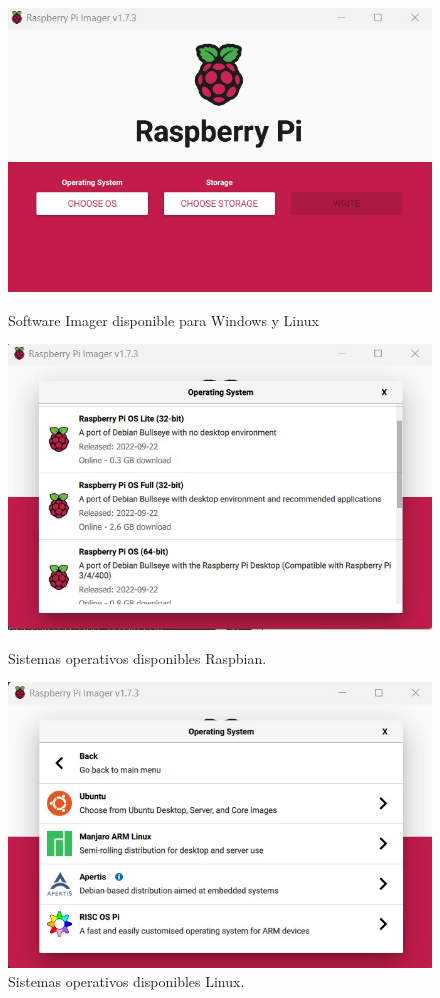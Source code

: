 \documentclass[12pt]{book} %
\begin{document}
\begin{figure}[H]
	\begin{center}
	\includegraphics[scale = 0.4]{imager.jpg}
	\caption{Software Imager disponible para Windows y Linux} 
	\includegraphics[scale = 0.4]{Imager2.jpg}
	\caption{Sistemas operativos disponibles Raspbian.}
	\includegraphics[scale = 0.4]{Imager3.jpg}
	\caption{Sistemas operativos disponibles Linux.}
	\end{center}
	\end{figure}
\end{document}
